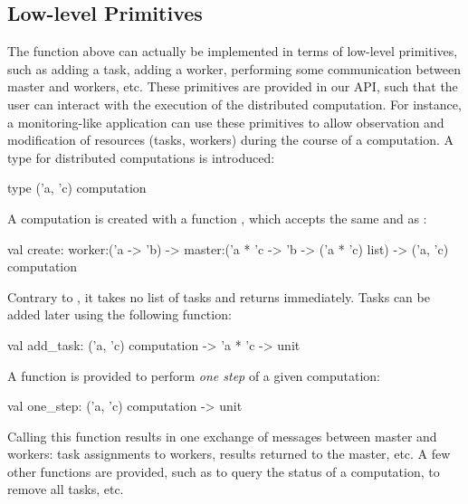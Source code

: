 \documentclass{llncs}
\newcommand{\Ocaml}{OCaml}
\begin{document}

\subsection{Low-level Primitives}


The function  above can actually be implemented in terms
of low-level primitives, such as adding a task, adding a worker,
performing some communication between master and workers, etc.
These primitives are provided in our API, such that the user can
interact with the execution of the distributed computation.  For
instance, a monitoring-like application can use these primitives to
allow observation and modification of resources (tasks, workers)
during the course of a computation.
A type for distributed computations is introduced:
\begin{ocaml}
  type ('a, 'c) computation
\end{ocaml}
A computation is created with a function , which accepts
the same  and  as :
\begin{ocaml}
  val create: worker:('a -> 'b) -> 
    master:('a * 'c -> 'b -> ('a * 'c) list) -> ('a, 'c) computation
\end{ocaml}
Contrary to , it takes no list of tasks and returns
immediately. Tasks can be added later using the following function:
\begin{ocaml}
  val add_task: ('a, 'c) computation -> 'a * 'c -> unit
\end{ocaml}
A function is provided to perform \emph{one step} of a given
computation:
\begin{ocaml}
  val one_step: ('a, 'c) computation -> unit
\end{ocaml}
Calling this function results in one exchange of messages between
master and workers: task assignments to workers, results returned to
the master, etc. A few other functions are provided, such as
 to query the status of a computation,  to remove
all tasks, etc.
\end{document}
